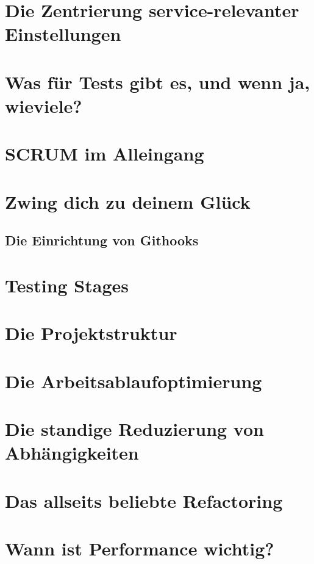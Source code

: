 \section{Die Zentrierung service-relevanter Einstellungen}

\section{Was für Tests gibt es, und wenn ja, wieviele?}

\section{SCRUM im Alleingang}

\section{Zwing dich zu deinem Glück}

\subsection{Die Einrichtung von Githooks}
\section{Testing Stages}

\section{Die Projektstruktur}

\section{Die Arbeitsablaufoptimierung}

\section{Die standige Reduzierung von Abhängigkeiten}

\section{Das allseits beliebte Refactoring}

\section{Wann ist Performance wichtig?}

